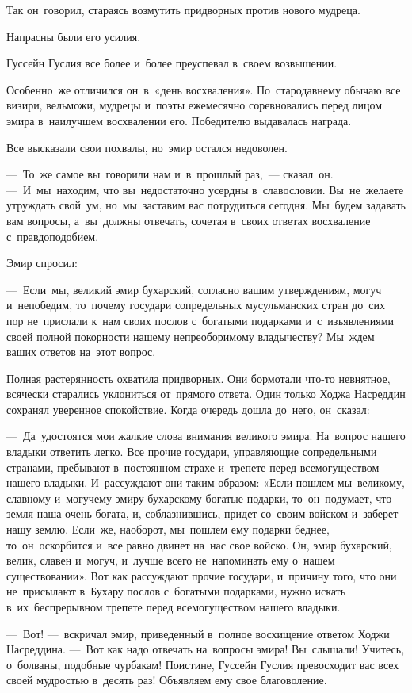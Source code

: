 \documentclass[12pt,a4paper]{book}
\begin{document}
Так он~говорил, стараясь возмутить придворных против нового мудреца.

Напрасны были его усилия.

Гуссейн Гуслия все более и~более преуспевал в~своем возвышении.

Особенно~же отличился он~в~«день восхваления». По~стародавнему обычаю все визири, вельможи, мудрецы и~поэты ежемесячно соревновались перед лицом эмира в~наилучшем восхвалении его. Победителю выдавалась награда.

Все высказали свои похвалы, но~эмир остался недоволен.

—~То~же самое вы~говорили нам и~в~прошлый раз,~— сказал~он. —~И~мы~находим, что вы~недостаточно усердны в~славословии. Вы~не~желаете утруждать свой~ум, но~мы~заставим вас потрудиться сегодня. Мы~будем задавать вам вопросы, а~вы~должны отвечать, сочетая в~своих ответах восхваление с~правдоподобием.

Эмир спросил:

—~Если~мы, великий эмир бухарский, согласно вашим утверждениям, могуч и~непобедим, то~почему государи сопредельных мусульманских стран до~сих пор не~прислали к~нам своих послов с~богатыми подарками и~с~изъявлениями своей полной покорности нашему непреоборимому владычеству? Мы~ждем ваших ответов на~этот вопрос.

Полная растерянность охватила придворных. Они бормотали что-то невнятное, всячески старались уклониться от~прямого ответа. Один только Ходжа Насреддин сохранял уверенное спокойствие. Когда очередь дошла до~него, он~сказал:

—~Да~удостоятся мои жалкие слова внимания великого эмира. На~вопрос нашего владыки ответить легко. Все прочие государи, управляющие сопредельными странами, пребывают в~постоянном страхе и~трепете перед всемогуществом нашего владыки. И~рассуждают они таким образом: «Если пошлем мы~великому, славному и~могучему эмиру бухарскому богатые подарки, то~он~подумает, что земля наша очень богата, и, соблазнившись, придет со~своим войском и~заберет нашу землю. Если~же, наоборот, мы~пошлем ему подарки беднее, то~он~оскорбится и~все равно двинет на~нас свое войско. Он, эмир бухарский, велик, славен и~могуч, и~лучше всего не~напоминать ему о~нашем существовании». Вот как рассуждают прочие государи, и~причину того, что они не~присылают в~Бухару послов с~богатыми подарками, нужно искать в~их~беспрерывном трепете перед всемогуществом нашего владыки.

—~Вот! —~вскричал эмир, приведенный в~полное восхищение ответом Ходжи Насреддина. —~Вот как надо отвечать на~вопросы эмира! Вы~слышали! Учитесь, о~болваны, подобные чурбакам! Поистине, Гуссейн Гуслия превосходит вас всех своей мудростью в~десять раз! Объявляем ему свое благоволение.
\end{document}
